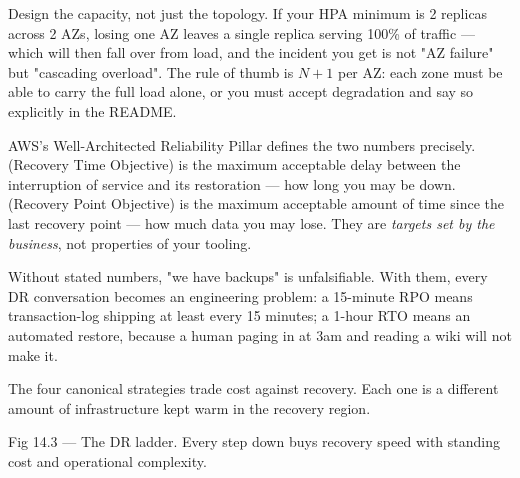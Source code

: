 \begin{reliability}
Design the capacity, not just the topology. If your HPA minimum is 2 replicas across 2 AZs, losing one AZ leaves a single replica serving 100\% of traffic --- which will then fall over from load, and the incident you get is not "AZ failure" but "cascading overload". The rule of thumb is $N+1$ per AZ: each zone must be able to carry the full load alone, or you must accept degradation and say so explicitly in the README.
\end{reliability}


 AWS's Well-Architected Reliability Pillar defines the two numbers precisely.  (Recovery Time Objective) is the maximum acceptable delay between the interruption of service and its restoration --- how long you may be down.  (Recovery Point Objective) is the maximum acceptable amount of time since the last recovery point --- how much data you may lose. They are \emph{targets set by the business}, not properties of your tooling.

 Without stated numbers, "we have backups" is unfalsifiable. With them, every DR conversation becomes an engineering problem: a 15-minute RPO means transaction-log shipping at least every 15 minutes; a 1-hour RTO means an automated restore, because a human paging in at 3am and reading a wiki will not make it.

 The four canonical strategies trade cost against recovery. Each one is a different amount of infrastructure kept warm in the recovery region.

\begin{wbfigure}{Fig 14.3 — The DR ladder. Every step down buys recovery speed with standing cost and operational complexity.}
\end{wbfigure}

